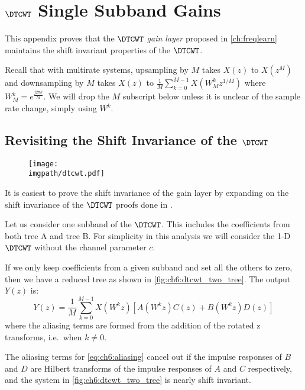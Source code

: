 \chapter{$\DTCWT$ Single Subband Gains}\label{app:ch6:dtcwt}
\def \path {freqlearn/}
\def \imgpath {freqlearn/images}
This appendix proves that the $\DTCWT$ \emph{gain layer} proposed in
\autoref{ch:freqlearn} maintains the shift invariant properties of the
$\DTCWT$.

Recall that with multirate systems, upsampling by $M$ takes $X(z)$ to
$X(z^M)$ and downsampling by $M$ takes $X(z)$ to $\frac{1}{M}\sum_{k=0}^{M-1} X(W_M^k
z^{1/M})$ where $W_M^k = e^{\frac{j2\pi k}{M}}$. We will drop the $M$ subscript
below unless it is unclear of the sample rate change, simply using $W^k$.


\section{Revisiting the Shift Invariance of the $\DTCWT$}
\begin{figure}[t]
  \centering
  \texttt{[image: \\imgpath/dtcwt.pdf]}
  \label{fig:ch6:dtcwt_two_tree}
\end{figure}
It is easiest to prove the shift invariance of the gain layer by expanding on
the shift invariance of the $\DTCWT$ proofs done in
\cite{kingsbury_complex_2001}.

Let us consider one subband of the $\DTCWT$. This includes the coefficients from
both tree A and tree B. For simplicity in this analysis we will consider the 1-D
$\DTCWT$ without the channel parameter $c$. 

If we only keep coefficients from a given
subband and set all the others to zero, then we have a reduced tree as shown in
\autoref{fig:ch6:dtcwt_two_tree}. The output $Y(z)$ is:
%
\begin{equation}
  Y(z) = \frac{1}{M} \sum_{k=0}^{M-1}X(W^k z) \left[A(W^k z)C(z) + B(W^k z)D(z)\right]
  \label{eq:ch6:aliasing}
\end{equation}
%
where the aliasing terms are formed from the addition of the rotated z
transforms, i.e.\ when $k \neq 0$.

\begin{theorem} \label{thm:ch6:shiftinv}
  The aliasing terms for \eqref{eq:ch6:aliasing} cancel out if the impulse
  responses of $B$ and $D$ are Hilbert transforms of the impulse responses of
  $A$ and $C$ respectively, and the system in \autoref{fig:ch6:dtcwt_two_tree}
  is nearly shift invariant.
\end{theorem}

